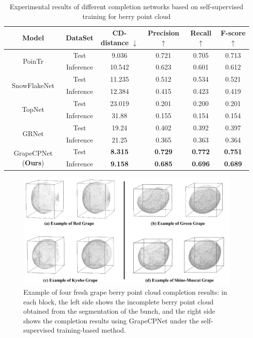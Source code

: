 \documentclass[12pt]{article}
\begin{document}
\begin{table}[h]
    \centering
    \caption{Experimental results of different completion networks based on self-supervised training for berry point cloud}
    \begin{tabular}{cccccc}
        \hline
        \textbf{Model} & \textbf{DataSet} & \textbf{CD-distance $\downarrow$} & \textbf{Precision $\uparrow$} & \textbf{Recall $\uparrow$} & \textbf{F-score $\uparrow$} \\
        \hline
        \multirow{2}{*}{PoinTr} & Test & 9.036 & 0.721 & 0.705 & 0.713 \\
        \cline{2-6}
        & Inference & 10.542 & 0.623 & 0.601 & 0.612 \\
        \hline
        \multirow{2}{*}{SnowFlakeNet} & Test & 11.235 & 0.512 & 0.534 & 0.521 \\
        \cline{2-6}
        & Inference & 12.384 & 0.415 & 0.423 & 0.419 \\
        \hline
        \multirow{2}{*}{TopNet} & Test & 23.019 & 0.201 & 0.200 & 0.201 \\
        \cline{2-6}
        & Inference & 31.88 & 0.155 & 0.154 & 0.154 \\
        \hline
        \multirow{2}{*}{GRNet} & Test & 19.24 & 0.402 & 0.392 & 0.397 \\
        \cline{2-6}
        & Inference & 21.25 & 0.365 & 0.363 & 0.364 \\
        \hline
        \multirow{2}{*}{GrapeCPNet (\textbf{Ours})} & Test & \textbf{8.315} & \textbf{0.729} & \textbf{0.772} & \textbf{0.751} \\
        \cline{2-6}
        & Inference & \textbf{9.158} & \textbf{0.685} & \textbf{0.696} & \textbf{0.689} \\
        \hline
    \end{tabular}
    \label{tbl:4}
\end{table}

\begin{figure}[hbt!]
    \centering
    \includegraphics[width=1\textwidth]{figures/Figure12.pdf}
    \caption{Example of four fresh grape berry point cloud completion results: in each block, the left side shows the incomplete berry point cloud obtained from the segmentation of the bunch, and the right side shows the completion results using GrapeCPNet under the self-supervised training-based method.}
    \label{fig:raw14}
\end{figure}
\end{document}
